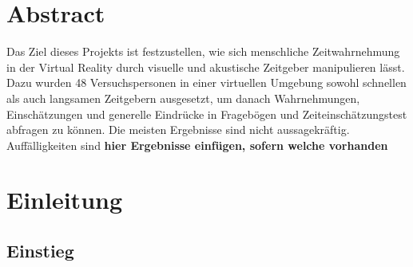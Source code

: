 \documentclass{Paper}
\begin{document}
\maketitle


\tableofcontents
\clearpage
	
\section{Abstract}

Das Ziel dieses Projekts ist festzustellen, wie sich menschliche Zeitwahrnehmung in der Virtual Reality durch visuelle und akustische Zeitgeber manipulieren lässt.  Dazu wurden 48 Versuchspersonen in einer virtuellen Umgebung sowohl schnellen als auch langsamen Zeitgebern ausgesetzt, um danach Wahrnehmungen, Einschätzungen und generelle Eindrücke in Fragebögen und Zeiteinschätzungstest abfragen zu können. Die meisten Ergebnisse sind nicht aussagekräftig. Auffälligkeiten sind \textbf{hier Ergebnisse einfügen, sofern welche vorhanden}

\section{Einleitung}
\subsection{Einstieg}
\end{document}
